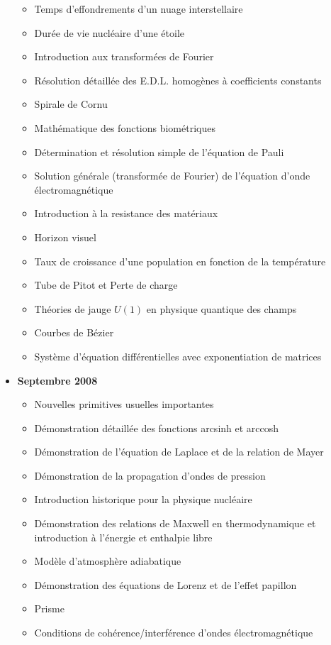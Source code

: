 \begin{itemize}
\begin{itemize}[noitemsep]
				\item Temps d'effondrements d'un nuage interstellaire
				\item Durée de vie nucléaire d'une étoile
				\item Introduction aux transformées de Fourier
				\item Résolution détaillée des E.D.L. homogènes à coefficients constants
				\item Spirale de Cornu
				\item Mathématique des fonctions biométriques
				\item Détermination et résolution simple de l'équation de Pauli
				\item Solution générale (transformée de Fourier) de l'équation d'onde électromagnétique
				\item Introduction à la resistance des matériaux
				\item Horizon visuel
				\item Taux de croissance d'une population en fonction de la température
				\item Tube de Pitot et Perte de charge
				\item Théories de jauge $U(1)$ en physique quantique des champs
				\item Courbes de Bézier
				\item Système d'équation différentielles avec exponentiation de matrices
			\end{itemize}
		\item \textbf{Septembre 2008}
			\begin{itemize}[noitemsep]
				\item Nouvelles primitives usuelles importantes
				\item Démonstration détaillée des fonctions arcsinh et arccosh
				\item Démonstration de l'équation de Laplace et de la relation de Mayer
				\item Démonstration de la propagation d'ondes de pression
				\item Introduction historique pour la physique nucléaire
				\item Démonstration des relations de Maxwell en thermodynamique et introduction à l'énergie et enthalpie libre
				\item Modèle d'atmosphère adiabatique
				\item Démonstration des équations de Lorenz et de l'effet papillon
				\item Prisme
				\item Conditions de cohérence/interférence d'ondes électromagnétique

\end{itemize}
\end{itemize}
